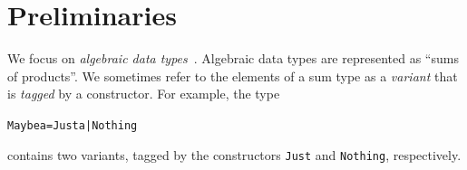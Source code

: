 \documentclass[10pt]{sigplanconf}
\newenvironment{code}{\begin{alltt}}{\end{alltt}}
\newcommand{\ttp}[1]{\texttt{#1}}
\begin{document}


\section{Preliminaries}\label{sec:preliminaries}



We focus on \emph{algebraic data types}~\cite{}.  Algebraic data types are
represented as ``sums of products''.  We sometimes refer to the elements of a
sum type as a \emph{variant} that is \emph{tagged} by a constructor.  For
example, the type
%
\begin{code}
Maybe a = Just a | Nothing
\end{code}
%
\noindent
contains two variants, tagged by the constructors \ttp{Just} and \ttp{Nothing},
respectively.
\end{document}
